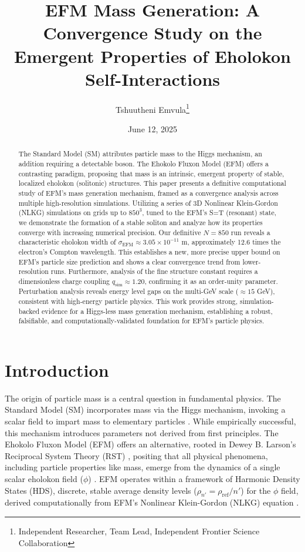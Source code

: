 \documentclass[11pt]{article}
\title{EFM Mass Generation: A Convergence Study on the Emergent Properties of Eholokon Self-Interactions}
\author{Tshuutheni Emvula\thanks{Independent Researcher, Team Lead, Independent Frontier Science Collaboration}}
\date{June 12, 2025}
\begin{document}
\maketitle

\begin{abstract}
The Standard Model (SM) attributes particle mass to the Higgs mechanism, an addition requiring a detectable boson. The Ehokolo Fluxon Model (EFM) offers a contrasting paradigm, proposing that mass is an intrinsic, emergent property of stable, localized eholokon (solitonic) structures. This paper presents a definitive computational study of EFM's mass generation mechanism, framed as a convergence analysis across multiple high-resolution simulations. Utilizing a series of 3D Nonlinear Klein-Gordon (NLKG) simulations on grids up to \(850^3\), tuned to the EFM's S=T (resonant) state, we demonstrate the formation of a stable soliton and analyze how its properties converge with increasing numerical precision. Our definitive \(N=850\) run reveals a characteristic eholokon width of \(\sigma_{\text{EFM}} \approx 3.05 \times 10^{-11}\) m, approximately 12.6 times the electron's Compton wavelength. This establishes a new, more precise upper bound on EFM's particle size prediction and shows a clear convergence trend from lower-resolution runs. Furthermore, analysis of the fine structure constant requires a dimensionless charge coupling \(q_{\text{sim}} \approx 1.20\), confirming it as an order-unity parameter. Perturbation analysis reveals energy level gaps on the multi-GeV scale (\(\approx 15\) GeV), consistent with high-energy particle physics. This work provides strong, simulation-backed evidence for a Higgs-less mass generation mechanism, establishing a robust, falsifiable, and computationally-validated foundation for EFM's particle physics.
\end{abstract}

\section{Introduction}
The origin of particle mass is a central question in fundamental physics. The Standard Model (SM) incorporates mass via the Higgs mechanism, invoking a scalar field to impart mass to elementary particles \citep{SMReviewPlaceholder}. While empirically successful, this mechanism introduces parameters not derived from first principles. The Ehokolo Fluxon Model (EFM) offers an alternative, rooted in Dewey B. Larson's Reciprocal System Theory (RST) \citep{larson1959}, positing that all physical phenomena, including particle properties like mass, emerge from the dynamics of a single scalar eholokon field (\(\phi\)) \citep{emvula2025compendium_intro}. EFM operates within a framework of Harmonic Density States (HDS), discrete, stable average density levels (\(\rho_{n'} = \rho_{\text{ref}}/n'\)) for the \(\phi\) field, derived computationally from EFM's Nonlinear Klein-Gordon (NLKG) equation \citep{emvula2025efm_hds_validated}.
\end{document}
